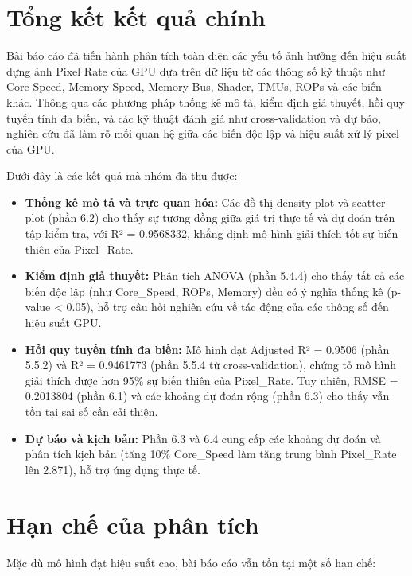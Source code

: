 \section{Tổng kết kết quả chính}

Bài báo cáo đã tiến hành phân tích toàn diện các yếu tố ảnh hưởng đến hiệu suất dựng ảnh Pixel Rate của GPU dựa trên dữ liệu từ các thông số kỹ thuật như Core Speed, Memory Speed, Memory Bus, Shader,  TMUs, ROPs và các biến khác. Thông qua các phương pháp thống kê mô tả, kiểm định giả thuyết, hồi quy tuyến tính đa biến, và các kỹ thuật đánh giá như cross-validation và dự báo, nghiên cứu đã làm rõ mối quan hệ giữa các biến độc lập và hiệu suất xử lý pixel của GPU.

Dưới đây là các kết quả mà nhóm đã thu được:

\begin{itemize}
    \item \textbf{Thống kê mô tả và trực quan hóa:} Các đồ thị density plot và scatter plot (phần 6.2) cho thấy sự tương đồng giữa giá trị thực tế và dự đoán trên tập kiểm tra, với R² = 0.9568332, khẳng định mô hình giải thích tốt sự biến thiên của Pixel\_Rate.
    \item \textbf{Kiểm định giả thuyết:} Phân tích ANOVA (phần 5.4.4) cho thấy tất cả các biến độc lập (như Core\_Speed, ROPs, Memory) đều có ý nghĩa thống kê (p-value < 0.05), hỗ trợ câu hỏi nghiên cứu về tác động của các thông số đến hiệu suất GPU.
    \item \textbf{Hồi quy tuyến tính đa biến:} Mô hình đạt Adjusted R² = 0.9506 (phần 5.5.2) và R² = 0.9461773 (phần 5.5.4 từ cross-validation), chứng tỏ mô hình giải thích được hơn 95\% sự biến thiên của Pixel\_Rate. Tuy nhiên, RMSE = 0.2013804  (phần 6.1) và các khoảng dự đoán rộng (phần 6.3) cho thấy vẫn tồn tại sai số cần cải thiện.
    \item \textbf{Dự báo và kịch bản:} Phần 6.3 và 6.4 cung cấp các khoảng dự đoán và phân tích kịch bản (tăng 10\% Core\_Speed làm tăng trung bình Pixel\_Rate lên 2.871), hỗ trợ ứng dụng thực tế.
\end{itemize}


\section{Hạn chế của phân tích}

Mặc dù mô hình đạt hiệu suất cao, bài báo cáo vẫn tồn tại một số hạn chế:

